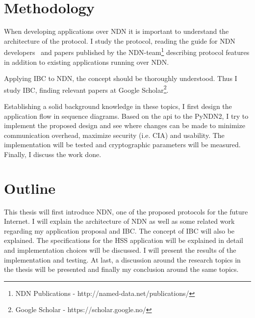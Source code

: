 \section{Methodology}

When developing applications over \gls{NDN} it is important to understand the architecture of the protocol. 
I study the protocol, reading the guide for NDN developers~\cite{NDN-0021} and papers published by the \gls{NDN}-team\footnote{NDN Publications - http://named-data.net/publications/} describing protocol features in addition to existing applications running over \gls{NDN}.

Applying \gls{IBC} to \gls{NDN}, the concept should be thoroughly understood.
Thus I study \gls{IBC}, finding relevant papers at Google Scholar\footnote{Google Scholar - https://scholar.google.no/}.

Establishing a solid background knowledge in these topics, I first design the application flow in sequence diagrams.
Based on the \gls{api} to the \gls{PyNDN2}, I try to implement the proposed design and see where changes can be made to minimize communication overhead, maximize security (i.e. \gls{CIA}) and usability.
The implementation will be tested and cryptographic parameters will be measured.
Finally, I discuss the work done.

\section{Outline}

This thesis will first introduce \gls{NDN}, one of the proposed protocols for the future Internet.
I will explain the architecture of \gls{NDN} as well as some related work regarding my application proposal and \gls{IBC}. 
The concept of \gls{IBC} will also be explained.
The specifications for the \gls{HSS} application will be explained in detail and implementation choices will be discussed.
I will present the results of the implementation and testing.
At last, a discussion around the research topics in the thesis will be presented and finally my conclusion around the same topics.
